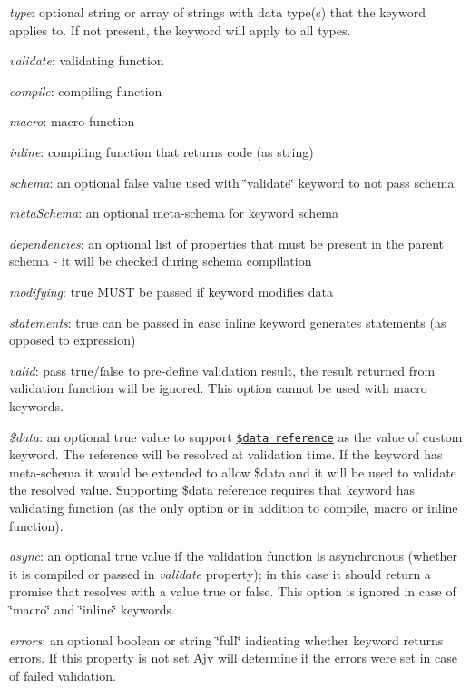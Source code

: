 \begin{DoxyItemize}
\item {\itshape type}\+: optional string or array of strings with data type(s) that the keyword applies to. If not present, the keyword will apply to all types.
\item {\itshape validate}\+: validating function
\item {\itshape compile}\+: compiling function
\item {\itshape macro}\+: macro function
\item {\itshape inline}\+: compiling function that returns code (as string)
\item {\itshape schema}\+: an optional {\ttfamily false} value used with \char`\"{}validate\char`\"{} keyword to not pass schema
\item {\itshape meta\+Schema}\+: an optional meta-\/schema for keyword schema
\item {\itshape dependencies}\+: an optional list of properties that must be present in the parent schema -\/ it will be checked during schema compilation
\item {\itshape modifying}\+: {\ttfamily true} M\+U\+ST be passed if keyword modifies data
\item {\itshape statements}\+: {\ttfamily true} can be passed in case inline keyword generates statements (as opposed to expression)
\item {\itshape valid}\+: pass {\ttfamily true}/{\ttfamily false} to pre-\/define validation result, the result returned from validation function will be ignored. This option cannot be used with macro keywords.
\item {\itshape \$data}\+: an optional {\ttfamily true} value to support \href{#data-reference}{\tt \$data reference} as the value of custom keyword. The reference will be resolved at validation time. If the keyword has meta-\/schema it would be extended to allow \$data and it will be used to validate the resolved value. Supporting \$data reference requires that keyword has validating function (as the only option or in addition to compile, macro or inline function).
\item {\itshape async}\+: an optional {\ttfamily true} value if the validation function is asynchronous (whether it is compiled or passed in {\itshape validate} property); in this case it should return a promise that resolves with a value {\ttfamily true} or {\ttfamily false}. This option is ignored in case of \char`\"{}macro\char`\"{} and \char`\"{}inline\char`\"{} keywords.
\item {\itshape errors}\+: an optional boolean or string {\ttfamily \char`\"{}full\char`\"{}} indicating whether keyword returns errors. If this property is not set Ajv will determine if the errors were set in case of failed validation.
\end{DoxyItemize}

